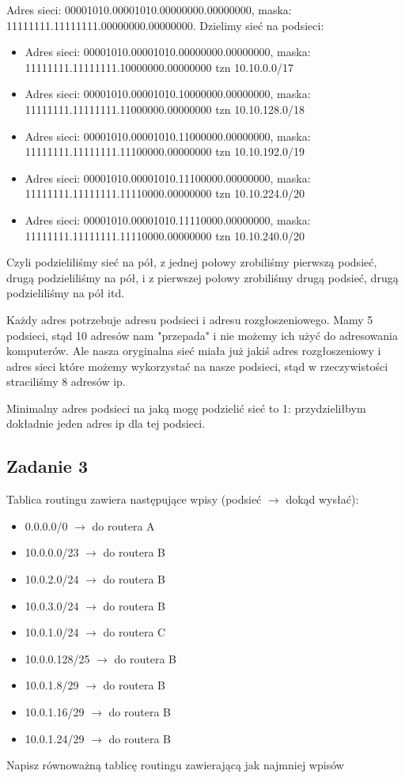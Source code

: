 \documentclass[a4paper]{article}
\begin{document}
Adres sieci: 00001010.00001010.00000000.00000000, maska: 11111111.11111111.00000000.00000000. Dzielimy sieć na podsieci:\\
\begin{itemize}
\item Adres sieci: 00001010.00001010.00000000.00000000, maska: 11111111.11111111.10000000.00000000 tzn 10.10.0.0/17
\item Adres sieci: 00001010.00001010.10000000.00000000, maska: 11111111.11111111.11000000.00000000 tzn 10.10.128.0/18
\item Adres sieci: 00001010.00001010.11000000.00000000, maska: 11111111.11111111.11100000.00000000 tzn 10.10.192.0/19
\item Adres sieci: 00001010.00001010.11100000.00000000, maska: 11111111.11111111.11110000.00000000 tzn 10.10.224.0/20
\item Adres sieci: 00001010.00001010.11110000.00000000, maska: 11111111.11111111.11110000.00000000 tzn 10.10.240.0/20


\end{itemize}
Czyli podzieliliśmy sieć na pół, z jednej połowy zrobiliśmy pierwszą podsieć, drugą podzieliliśmy na pół, i z pierwszej połowy zrobiliśmy drugą podsieć, drugą podzieliliśmy na pół itd.

Każdy adres potrzebuje adresu podsieci i adresu rozgłoszeniowego. Mamy 5 podsieci, stąd 10 adresów nam "przepada" i nie możemy ich użyć do adresowania komputerów. Ale nasza oryginalna sieć miała już jakiś adres rozgłoszeniowy i adres sieci które możemy wykorzystać na nasze podsieci, stąd w rzeczywistości straciliśmy 8 adresów ip.

Minimalny adres podsieci na jaką mogę podzielić sieć to 1: przydzieliłbym dokładnie jeden adres ip dla tej podsieci.

\subsection*{Zadanie 3}
Tablica routingu zawiera następujące wpisy (podsieć $\rightarrow$ dokąd wysłać):
\begin{itemize}
\item 0.0.0.0/0 $\rightarrow$ do routera A
\item 10.0.0.0/23 $\rightarrow$ do routera B
\item 10.0.2.0/24 $\rightarrow$ do routera B
\item 10.0.3.0/24 $\rightarrow$ do routera B
\item 10.0.1.0/24 $\rightarrow$ do routera C
\item 10.0.0.128/25 $\rightarrow$ do routera B
\item 10.0.1.8/29 $\rightarrow$ do routera B
\item 10.0.1.16/29 $\rightarrow$ do routera B
\item 10.0.1.24/29 $\rightarrow$ do routera B
\end{itemize}
Napisz równoważną tablicę routingu zawierającą jak najmniej wpisów
\end{document}
